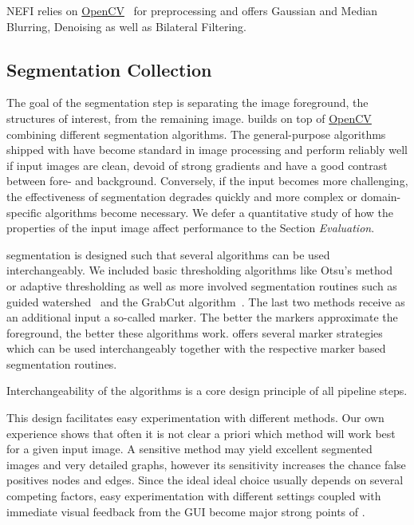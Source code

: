 		NEFI relies on \href{http://opencv.org/}{OpenCV}~\cite{opencv} for preprocessing and offers Gaussian and Median Blurring, Denoising as well as Bilateral Filtering.

	\subsection{Segmentation Collection}

		The goal of the segmentation step is separating the image foreground, \ie the structures of interest, from the remaining image. \NEFI builds on top of \href{http://opencv.org/}{OpenCV}~\cite{opencv} combining different segmentation algorithms. The general-purpose algorithms shipped with \NEFI have become standard in image processing and perform reliably well if input images are clean, devoid of strong gradients and have a good contrast between fore- and background. Conversely, if the input becomes more challenging, the effectiveness of \NEFIs segmentation degrades quickly and more complex or domain-specific algorithms become necessary. We defer a quantitative study of how the properties of the input image affect \NEFIs performance to the Section \emph{Evaluation}. 

		\NEFIs segmentation is designed such that several algorithms can be used interchangeably. We included basic thresholding algorithms like Otsu's method~\cite{otsu1979} or adaptive thresholding as well as more involved segmentation routines such as guided watershed~\cite{watershed91} and the GrabCut algorithm~\cite{grabcut2004}. The last two methods receive as an additional input a so-called marker. The better the markers approximate the foreground, the better these algorithms work. \NEFI offers several marker strategies which can be used interchangeably together with the respective marker based segmentation routines. 

		Interchangeability of the algorithms is a core design principle of all pipeline steps.

		This design facilitates easy experimentation with different methods. Our own experience shows that often it is not clear a priori which method will work best for a given input image. A sensitive method may yield excellent segmented images and very detailed graphs, however its sensitivity increases the chance false positives nodes and edges. Since the ideal ideal choice usually depends on several competing factors, easy experimentation with different settings coupled with immediate visual feedback from the GUI become major strong points of \NEFI.


